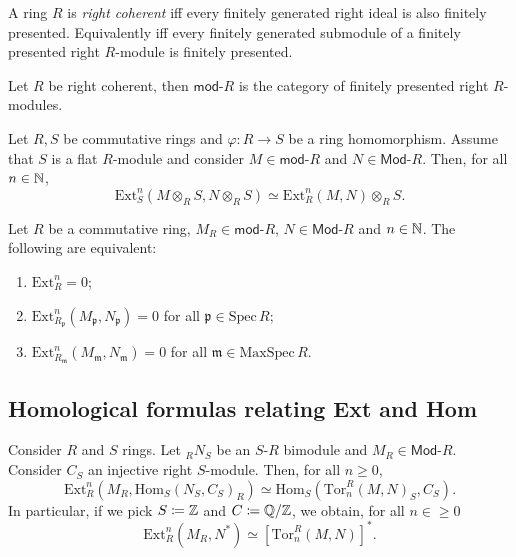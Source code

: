 \begin{defn}
	A ring $R$ is {\em right coherent} iff every finitely generated right ideal
	is also finitely presented.
	Equivalently iff every finitely generated submodule of a finitely
	presented right $R$-module is finitely presented.
\end{defn}
\begin{rem}[]
	Let $R$ be right coherent, then
	$\mathsf{mod}\text{-}R$ is the category of finitely presented right $R$-modules.
\end{rem}

\begin{prop}
	Let $R,S$ be commutative rings and $\varphi\colon R \to S$ be a ring homomorphism.
	Assume that $S$ is a flat $R$-module and
	consider $M \in \mathsf{mod}\text{-}R$ and $N \in \mathsf{Mod}\text{-}R$.
	Then, for all $n \in \mathbb{N}$,
	\begin{equation}
		\mathrm{Ext}^n_S \left( M \otimes_R S, N \otimes_R S \right) \simeq
		\mathrm{Ext}^n_R \left( M,N \right) \otimes_R S
	.\end{equation} 
\end{prop} 

\begin{cor}
	Let $R$ be a commutative ring,
	$M_R \in \mathsf{mod}\text{-}R$, $N \in \mathsf{Mod}\text{-}R$ and $n \in \mathbb{N}$.
	The following are equivalent:
	\begin{enumerate}
		\item $\mathrm{Ext}^n_R = 0$;
		\item $\mathrm{Ext}^{n}_{R_{\mathfrak{p}}}
			\left( M_{\mathfrak{p}}, N_{\mathfrak{p}}\right) = 0$
			for all $\mathfrak{p} \in \mathrm{Spec}\, R$;
		\item $\mathrm{Ext}^{ n}_{ R_{\mathfrak{m}}} \left( M_{\mathfrak{m}}, N_{\mathfrak{m}} \right) = 0$
			for all $\mathfrak{m} \in \mathrm{MaxSpec}\, R$.
	\end{enumerate}
\end{cor} 

\subsection{Homological formulas relating Ext and Hom}
\begin{prop}
	Consider $R$ and $S$ rings.
	Let ${}_RN_S$ be an $S$-$R$ bimodule and $M_R \in \mathsf{Mod}\text{-}R$.
	Consider $C_S$ an injective right $S$-module.
	Then, for all $n \geq 0$,
	\begin{equation}
	\mathrm{Ext}^{ n}_{ R} \left( M_R, \mathrm{Hom}_{ S}\left( N_S, C_S \right)_R \right) \simeq
	\mathrm{Hom}_{ S}\left( \mathrm{Tor}^{ R}_{ n} \left( M, N \right)_S, C_S  \right)
	.\end{equation} 
	In particular, if we pick $S \coloneqq \mathbb{Z}$ and $C \coloneqq \mathbb{Q}/\mathbb{Z}$,
	we obtain, for all $n \in \geq 0$
	\begin{equation}
	\mathrm{Ext}^{ n}_{ R} \left( M_R, N^* \right) \simeq
	\left[ \mathrm{Tor}^{ R}_{ n} \left( M, N \right)\right]^*
	.\end{equation} 
\end{prop} 

